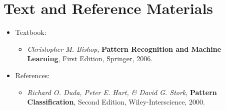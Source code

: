 \section{Text and Reference Materials}
\label{sec_text}
\begin{itemize}
	\item [\fromText{}] Textbook:
	\begin{itemize}
        \item \textit{Christopher M. Bishop},        
              \textbf{Pattern Recognition and Machine Learning},
              {First Edition},
              {Springer},
              {2006}.
	\end{itemize}
	\item [\fromRef{}] References:
	\begin{itemize}
        \item \textit{Richard O. Duda, Peter E. Hart, \& David G. Stork},        
                  \textbf{Pattern Classification},
                  {Second Edition},
                  {Wiley-Interscience},
                  {2000}.
        \end{itemize}
\end{itemize}
